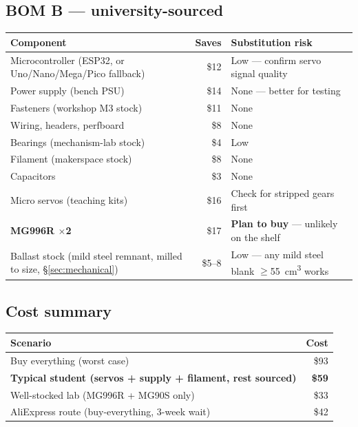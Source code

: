 \documentclass[11pt]{article}
\begin{document}
\subsection{BOM B --- university-sourced}
\begin{center}
\small
\begin{tabular}{L{7.2cm}rL{5.4cm}}
\toprule
\textbf{Component} & \textbf{Saves} & \textbf{Substitution risk} \\
\midrule
Microcontroller (ESP32, or Uno/Nano/Mega/Pico fallback) & \$12 & Low --- confirm servo signal quality \\
Power supply (bench PSU) & \$14 & None --- better for testing \\
Fasteners (workshop M3 stock) & \$11 & None \\
Wiring, headers, perfboard & \$8 & None \\
Bearings (mechanism-lab stock) & \$4 & Low \\
Filament (makerspace stock) & \$8 & None \\
Capacitors & \$3 & None \\
Micro servos (teaching kits) & \$16 & Check for stripped gears first \\
\textbf{MG996R $\times$2} & \$17 & \textbf{Plan to buy} --- unlikely on the shelf \\
Ballast stock (mild steel remnant, milled to size, \S\ref{sec:mechanical}) & \$5--8 & Low --- any mild steel blank $\geq$55~cm\textsuperscript{3} works \\
\bottomrule
\end{tabular}
\end{center}

\subsection{Cost summary}
\begin{center}
\begin{tabular}{lr}
\toprule
\textbf{Scenario} & \textbf{Cost} \\
\midrule
Buy everything (worst case) & \$93 \\
\textbf{Typical student (servos + supply + filament, rest sourced)} & \textbf{\$59} \\
Well-stocked lab (MG996R + MG90S only) & \$33 \\
AliExpress route (buy-everything, 3-week wait) & \$42 \\
\bottomrule
\end{tabular}
\end{center}
\end{document}
